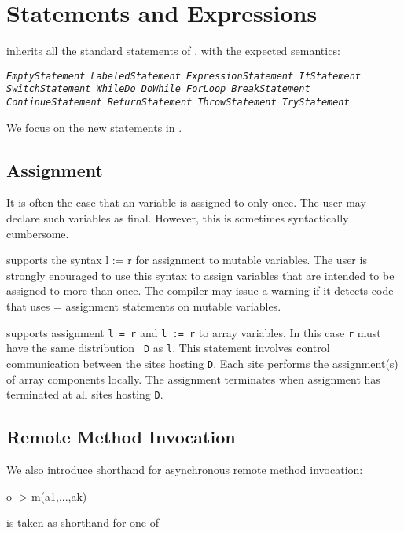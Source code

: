 \chapter{Statements and Expressions}\label{XtenStatements}

\Xten{} inherits all the standard statements of \Java{}, with the expected semantics:

\begin{x10}
\em\tt EmptyStatement      LabeledStatement  
\em\tt ExpressionStatement IfStatement
\em\tt SwitchStatement     WhileDo
\em\tt DoWhile             ForLoop           
\em\tt BreakStatement      ContinueStatement  
\em\tt ReturnStatement   ThrowStatement
\em\tt TryStatement
\end{x10}

We focus on the new statements in \Xten. 


\section{Assignment}\label{AssignmentStatement}

It is often the case that an \Xten{} variable is assigned to only
once. The user may declare such variables as {\cf final}. However,
this is sometimes syntactically cumbersome.

{}\Xten{} supports the syntax {\cf l := r} for assignment to mutable
variables.  The user is strongly enouraged to use this syntax to
assign variables that are intended to be assigned to more than
once. The \Xten{} compiler may issue a warning if it detects code 
that uses {\cf =} assignment statements on {\cf mutable} variables.

{}\Xten{} supports assignment {\tt l = r} and {\tt l := r} to array
variables. In this case {\tt r} must have the same distribution {\tt
D} as {\tt l}. This statement involves control communication between
the sites hosting {\tt D}. Each site performs the assignment(s) of
array components locally. The assignment terminates when assignment
has terminated at all sites hosting {\tt D}.

\section{Remote Method Invocation}
We also introduce shorthand for asynchronous remote method invocation:

\begin{x10}
   o -> m(a1,...,ak)
\end{x10}
\noindent is taken as shorthand for one of

